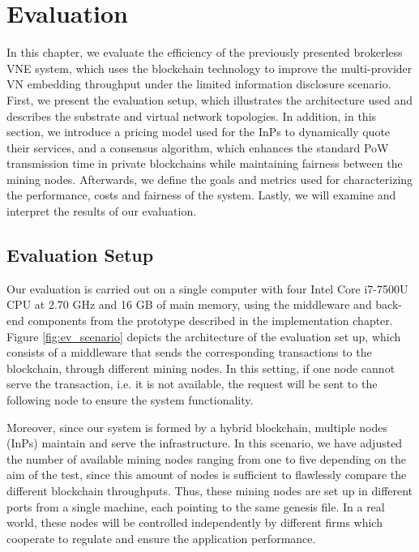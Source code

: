 \chapter{Evaluation}
\label{ch:evaluation}

In this chapter, we evaluate the efficiency of the previously presented brokerless VNE system, which uses the blockchain technology to improve the multi-provider VN embedding throughput under the limited information disclosure scenario. First, we present the evaluation setup, which illustrates the architecture used and describes the substrate and virtual network topologies. In addition, in this section, we introduce a pricing model used for the InPs to dynamically quote their services, and a consensus algorithm, which enhances the standard PoW transmission time in private blockchains while maintaining fairness between the mining nodes. Afterwards, we define the goals and metrics used for characterizing the performance, costs and fairness of the system. Lastly, we will examine and interpret the results of our evaluation.

\section{Evaluation Setup}

Our evaluation is carried out on a single computer with four Intel Core i7-7500U CPU at 2.70 GHz and 16 GB of main memory, using the middleware and back-end components from the prototype described in the implementation chapter. Figure \ref{fig:ev_scenario} depicts the architecture of the evaluation set up, which consists of a middleware that sends the corresponding transactions to the blockchain, through different mining nodes. In this setting, if one node cannot serve the transaction, i.e. it is not available, the request will be sent to the following node to ensure the system functionality.

Moreover, since our system is formed by a hybrid blockchain, multiple nodes (InPs) maintain and serve the infrastructure. In this scenario, we have adjusted the number of available mining nodes ranging from one to five depending on the aim of the test, since this amount of nodes is sufficient to flawlessly compare the different blockchain throughputs. Thus, these mining nodes are set up in different ports from a single machine, each pointing to the same genesis file. In a real world, these nodes will be controlled independently by different firms which cooperate to regulate and ensure the application performance.

